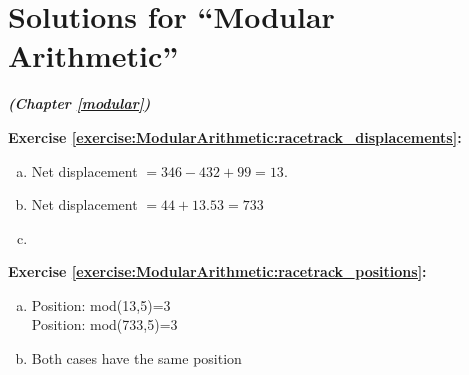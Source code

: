 \section{Solutions for ``Modular Arithmetic''}
\noindent \textbf{\textit{ (Chapter \ref{modular})}}\bigskip




\noindent\textbf{Exercise \ref{exercise:ModularArithmetic:racetrack_displacements}:}
\begin{enumerate}[(a)]
\item
Net displacement $=346-432+99=13$.

\item 
Net displacement $=44+13.53=733$

\item 

\end{enumerate}

\noindent\textbf{Exercise \ref{exercise:ModularArithmetic:racetrack_positions}:}
\begin{enumerate}[(a)]
\item
Position: mod(13,5)=3\\
Position: mod(733,5)=3

\item
Both cases have the same position
\end{enumerate}

